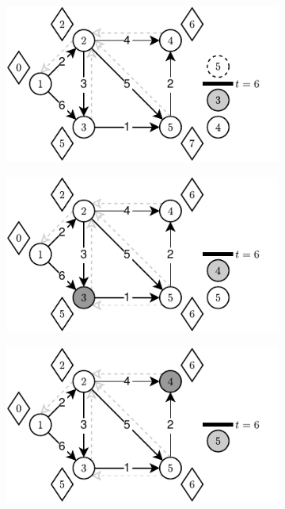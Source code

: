 \begin{figure}[!htbp]
\begin{subfigure}[b]{0.32\textwidth}
		\caption{}
	\end{subfigure}
	\begin{subfigure}[b]{0.32\textwidth}
		\includegraphics[width=\textwidth]{Chapter_III/THRESHOLD-Example/d.pdf}
		\caption{}
	\end{subfigure}
	\begin{subfigure}[b]{0.32\textwidth}
		\includegraphics[width=\textwidth]{Chapter_III/THRESHOLD-Example/e.pdf}
		\caption{}
	\end{subfigure}
	\begin{subfigure}[b]{0.32\textwidth}
		\includegraphics[width=\textwidth]{Chapter_III/THRESHOLD-Example/f.pdf}

\end{subfigure}
\end{figure}
